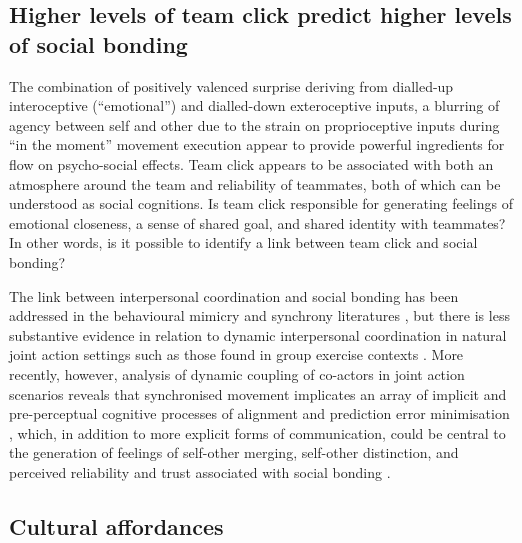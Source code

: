\begin{CJK}{UTF8}{gbsn}
\subsection{Higher levels of team click predict higher levels of social bonding \label{sect:teamClickSocialBonding}}

The combination of positively valenced surprise deriving from dialled-up interoceptive (``emotional'') and dialled-down exteroceptive inputs, a blurring of agency between self and other due to the strain on proprioceptive inputs during ``in the moment'' movement execution appear to provide powerful ingredients for flow on psycho-social effects.  Team click appears to be associated with both an atmosphere around the team and reliability of teammates, both of which can be understood as social cognitions.  Is team click responsible for generating feelings of emotional closeness, a sense of shared goal, and shared identity with teammates?  In other words, is it possible to identify a link between team click and social bonding?

The link between interpersonal coordination and social bonding has been addressed in the behavioural mimicry and synchrony literatures \citep[e.g.,][]{Wheatley2012,Launay2016,Mogan2017}, but there is less substantive evidence in relation to dynamic interpersonal coordination in natural joint action settings such as those found in group exercise contexts \citep{Marsh2009,Miles2009,Lumsden2012}.  More recently, however, analysis of dynamic coupling of co-actors in joint action scenarios reveals that synchronised movement implicates an array of implicit and pre-perceptual cognitive processes of alignment and prediction error minimisation \citep{Schmidt2011}, which, in addition to more explicit forms of communication, could be central to the generation of feelings of self-other merging, self-other distinction, and perceived reliability and trust associated with social bonding \citep{Marsh2009}.







\subsection{Cultural affordances}


\end{CJK}
